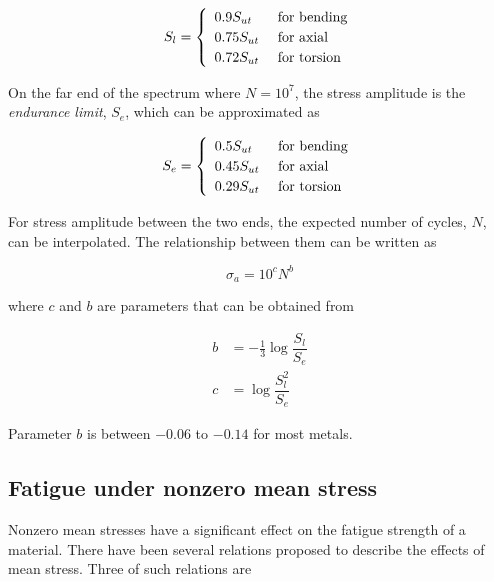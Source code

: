 \documentclass[
fontsize=10pt,
a4paper,
twosides=false,
open=any,
svgnames,
]{kaobook} %
\begin{document}
\begin{equation}
  S_l = \left\{
    \renewcommand{\arraystretch}{1.2}
    \begin{array}{ll}
      0.9 S_{ut} &\text{ for bending} \\
      0.75 S_{ut} &\text{ for axial} \\
      0.72 S_{ut} &\text{ for torsion}
    \end{array}
  \right.
\end{equation}

On the far end of the spectrum where $N = 10^7$, the stress amplitude is the \emph{endurance limit}, $S_e$, which can be approximated as

\begin{equation}
  S_e = \left\{
    \renewcommand{\arraystretch}{1.2}
    \begin{array}{ll}
      0.5 S_{ut} & \text{ for bending} \\
      0.45 S_{ut} &\text{ for axial} \\
      0.29 S_{ut} &\text{ for torsion}
    \end{array}
  \right.
\end{equation}

For stress amplitude between the two ends, the expected number of cycles, $N$, can be interpolated. The relationship between them can be written as

\begin{equation}
  \sigma_a = 10^cN^b
\end{equation}

where $c$ and $b$ are parameters that can be obtained from

\begin{align*}
  b &= - \frac{1}{3} \log \dfrac{S_l}{S_e} \\
  c &= \log \dfrac{S_l^2}{S_e}
\end{align*}

Parameter $b$ is between $-0.06$ to $-0.14$ for most metals.

\subsection{Fatigue under nonzero mean stress}

Nonzero mean stresses have a significant effect on the fatigue strength of a material. There have been several relations proposed to describe the effects of mean stress. Three of such relations are
\end{document}
